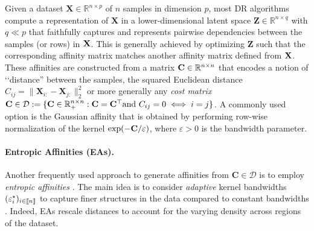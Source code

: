 Given a dataset $\mathbf{X} \in \mathbb{R}^{n \times p}$ of $n$ samples in dimension $p$, most DR algorithms compute a representation of $\mathbf{X}$ in a lower-dimensional latent space $\mathbf{Z} \in \mathbb{R}^{n \times q}$ with $q \ll p$ that faithfully captures and represents pairwise dependencies between the samples (or rows) in $\mathbf{X}$. This is generally achieved by optimizing $\mathbf{Z}$ such that the corresponding affinity matrix matches another affinity matrix defined from $\mathbf{X}$. These affinities are constructed from a matrix $\mathbf{C} \in \mathbb{R}^{n \times n}$ that encodes a notion of ‘‘distance'' between the samples, \eg the squared Euclidean distance $C_{ij} = \|\mathbf{X}_{i:}-\mathbf{X}_{j:}\|_2^2$ or more generally any \emph{cost matrix} $\mathbf{C} \in \mathcal{D} := \{\mathbf{C} \in \mathbb{R}_+^{n \times n} : \mathbf{C} = \mathbf{C}^\top \text{and } C_{ij}=0 \iff i=j\}$. A commonly used option is the Gaussian affinity that is obtained by performing row-wise normalization of the kernel $\exp(-\mathbf{C} / \varepsilon)$, where $\varepsilon >0$ is the bandwidth parameter.

\paragraph{Entropic Affinities (EAs).} Another frequently used approach to generate affinities from $\mathbf{C} \in \mathcal{D}$ is to employ \emph{entropic affinities}  \cite{hinton2002stochastic}. The main idea is to consider \emph{adaptive} kernel bandwidths $(\varepsilon^\star_i)_{i \in {[\![n]\!]}}$ to capture finer structures in the data compared to constant bandwidths \cite{van2018recovering}. Indeed, EAs rescale distances to account for the varying density across regions of the dataset.

